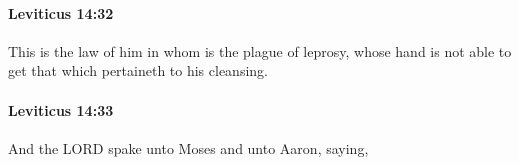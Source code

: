 		\paragraph{Leviticus 14:32} %
			\label{LEVITICUS-14-32}

			This is the law of him in whom is the plague of leprosy, whose hand is not able to get that which pertaineth to his cleansing.


		\paragraph{Leviticus 14:33} %
			\label{LEVITICUS-14-33}

			And the LORD spake unto Moses and unto Aaron, saying,


